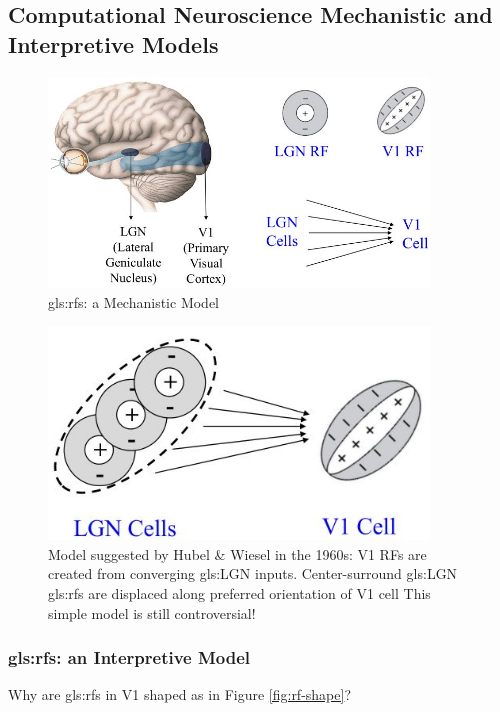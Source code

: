 \documentclass[]{article}
\begin{document}
\subsection{Computational Neuroscience Mechanistic and Interpretive Models}


\begin{figure}[H]
	\caption[\Glspl{gls:rf}: a Mechanistic Model]{\Glspl{gls:rf}: a Mechanistic Model}
	\includegraphics[width=0.9\textwidth]{mech-rf}
\end{figure}

\begin{figure}[H]
	\caption[Model suggested by Hubel \& Wiesel in the 	1960s]{Model suggested by 	Hubel \& Wiesel in the 	1960s: V1 RFs are created from converging 	\gls{gls:LGN} inputs. Center-surround \gls{gls:LGN} \glspl{gls:rf} are displaced along preferred orientation of V1 cell This simple model is still controversial!}
	\includegraphics[width=0.9\textwidth]{mech-rf-v1}
\end{figure}

\subsubsection{\Glspl{gls:rf}: an Interpretive Model}
Why are \glspl{gls:rf} in V1 shaped as in Figure \ref{fig:rf-shape}?
\end{document}

